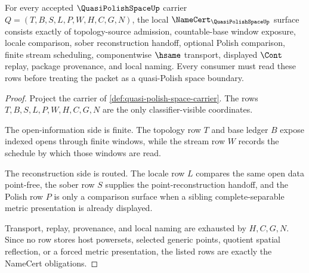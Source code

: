 \begin{theorem}
\label{thm:quasi-polish-space-namecert-obligations}
For every accepted $\QuasiPolishSpaceUp$ carrier $Q=(T,B,S,L,P,W,H,C,G,N)$, the local $\NameCert_{\QuasiPolishSpaceUp}$ surface consists exactly of topology-source admission, countable-base window exposure, locale comparison, sober reconstruction handoff, optional Polish comparison, finite stream scheduling, componentwise $\hsame$ transport, displayed $\Cont$ replay, package provenance, and local naming. Every consumer must read these rows before treating the packet as a quasi-Polish space boundary.
\end{theorem}
\begin{proof}
Project the carrier of \autoref{def:quasi-polish-space-carrier}. The rows $T,B,S,L,P,W,H,C,G,N$ are the only classifier-visible coordinates.

The open-information side is finite. The topology row $T$ and base ledger $B$ expose indexed opens through finite windows, while the stream row $W$ records the schedule by which those windows are read.

The reconstruction side is routed. The locale row $L$ compares the same open data point-free, the sober row $S$ supplies the point-reconstruction handoff, and the Polish row $P$ is only a comparison surface when a sibling complete-separable metric presentation is already displayed.

Transport, replay, provenance, and local naming are exhausted by $H,C,G,N$. Since no row stores host powersets, selected generic points, quotient spatial reflection, or a forced metric presentation, the listed rows are exactly the NameCert obligations.
\end{proof}

